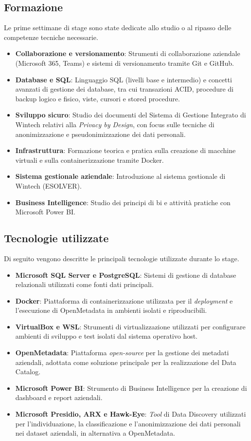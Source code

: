 \subsection{Formazione}
Le prime settimane di stage sono state dedicate allo studio o al ripasso delle competenze tecniche necessarie.
\begin{itemize}
    \item \textbf{Collaborazione e versionamento}: Strumenti di collaborazione aziendale (Microsoft 365, Teams) e sistemi di versionamento tramite Git e GitHub.
    \item \textbf{Database e SQL}: Linguaggio SQL (livelli base e intermedio) e concetti avanzati di gestione dei database, tra cui transazioni ACID, procedure di backup logico e fisico, viste, cursori e stored procedure.
    \item \textbf{Sviluppo sicuro}: Studio dei documenti del Sistema di Gestione Integrato di Wintech relativi alla \emph{Privacy by Design}, con focus sulle tecniche di anonimizzazione e pseudonimizzazione dei dati personali.
    \item \textbf{Infrastruttura}: Formazione teorica e pratica sulla creazione di macchine virtuali e sulla containerizzazione tramite Docker.
    \item \textbf{Sistema gestionale aziendale}: Introduzione al sistema gestionale di Wintech (ESOLVER).
    \item \textbf{Business Intelligence}: Studio dei principi di \gls{bi} e attività pratiche con Microsoft Power BI.
\end{itemize}

\subsection{Tecnologie utilizzate}
Di seguito vengono descritte le principali tecnologie utilizzate durante lo stage.
\begin{itemize}
    \item \textbf{Microsoft SQL Server e PostgreSQL}: Sistemi di gestione di database relazionali utilizzati come fonti dati principali.
    \item \textbf{Docker}: Piattaforma di containerizzazione utilizzata per il \emph{deployment} e l'esecuzione di OpenMetadata in ambienti isolati e riproducibili.
    \item \textbf{VirtualBox e WSL}: Strumenti di virtualizzazione utilizzati per configurare ambienti di sviluppo e test isolati dal sistema operativo host.
    \item \textbf{OpenMetadata}: Piattaforma \emph{open-source} per la gestione dei metadati aziendali, adottata come soluzione principale per la realizzazione del Data Catalog.
    \item \textbf{Microsoft Power BI}: Strumento di Business Intelligence per la creazione di dashboard e report aziendali.
    \item \textbf{Microsoft Presidio, ARX e Hawk-Eye}: \emph{Tool} di Data Discovery utilizzati per l'individuazione, la classificazione e l'anonimizzazione dei dati personali nei dataset aziendali, in alternativa a OpenMetadata.
\end{itemize}

